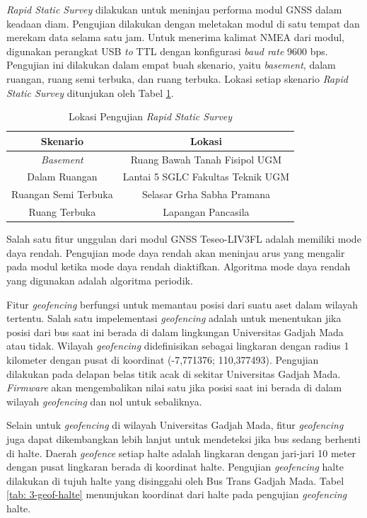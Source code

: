 \documentclass[conference]{IEEEtran}
\begin{document}
\textit{Rapid Static Survey} dilakukan untuk meninjau performa modul GNSS dalam keadaan diam. Pengujian dilakukan dengan meletakan modul di satu tempat dan merekam data selama satu jam. Untuk menerima kalimat NMEA dari modul, digunakan perangkat USB \textit{to} TTL dengan konfigurasi \textit{baud rate} 9600 bps. Pengujian ini dilakukan dalam empat buah skenario, yaitu \textit{basement}, dalam ruangan, ruang semi terbuka, dan ruang terbuka. Lokasi setiap skenario \textit{Rapid Static Survey} ditunjukan oleh Tabel \ref{tab: 3-rss-location}.

\begin{table}[hbt!]
	\caption{Lokasi Pengujian \textit{Rapid Static Survey}}
	\centering
	\renewcommand{\arraystretch}{1.5}
	\begin{tabular}{cc}
		\hline
		\textbf{Skenario} & \textbf{Lokasi} \\\hline
		\textit{Basement} &Ruang Bawah Tanah Fisipol UGM\\
		Dalam Ruangan & Lantai 5 SGLC Fakultas Teknik UGM\\
		Ruangan Semi Terbuka &  Selasar Grha Sabha Pramana\\
		Ruang Terbuka & Lapangan Pancasila\\
		\hline
	\end{tabular}
	\label{tab: 3-rss-location}
\end{table}

Salah satu fitur unggulan dari modul GNSS Teseo-LIV3FL adalah memiliki mode daya rendah. Pengujian mode daya rendah akan meninjau arus yang mengalir pada modul ketika mode daya rendah diaktifkan. Algoritma mode daya rendah yang digunakan adalah algoritma periodik.

Fitur \textit{geofencing} berfungsi untuk memantau posisi dari suatu aset dalam wilayah tertentu. Salah satu impelementasi \textit{geofencing} adalah untuk menentukan jika posisi dari bus saat ini berada di dalam lingkungan Universitas Gadjah Mada atau tidak. Wilayah \textit{geofencing} didefinisikan sebagai lingkaran dengan radius 1 kilometer dengan pusat di koordinat (-7,771376; 110,377493). Pengujian dilakukan pada delapan belas titik acak di sekitar Universitas Gadjah Mada. \textit{Firmware} akan mengembalikan nilai satu jika posisi saat ini berada di dalam wilayah \textit{geofencing} dan nol untuk sebaliknya.

Selain untuk \textit{geofencing} di wilayah Universitas Gadjah Mada, fitur \textit{geofencing} juga dapat dikembangkan lebih lanjut untuk mendeteksi jika bus sedang berhenti di halte. Daerah \textit{geofence} setiap halte adalah lingkaran dengan jari-jari 10 meter dengan pusat lingkaran berada di koordinat halte. Pengujian \textit{geofencing} halte dilakukan di tujuh halte yang disinggahi oleh Bus Trans Gadjah Mada. Tabel \ref{tab: 3-geof-halte} menunjukan koordinat dari halte pada pengujian \textit{geofencing} halte.
\end{document}
